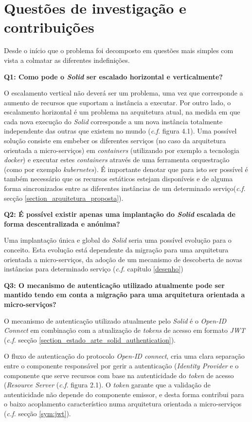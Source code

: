 \section{Questões de investigação e contribuições}
Desde o início que o problema foi decomposto em questões mais simples com vista a colmatar as diferentes indefinições.

\textbf{Q1: {Como pode o \emph{Solid} ser escalado horizontal e verticalmente?}}

O escalamento vertical não deverá ser um problema, uma vez que corresponde a aumento de recursos que suportam a instância a executar.
Por outro lado, o escalamento horizontal é um problema na arquitetura atual, na medida em que cada nova execução do \emph{Solid} corresponde a um nova instância totalmente independente das outras que existem no mundo (\emph{c.f.} figura 4.1).
Uma possível solução consiste em embeber os diferentes serviços (no caso da arquitetura orientada a micro-serviços) em \emph{containers} (utilizando por exemplo a tecnologia \emph{docker}) e executar estes \emph{containers} através de uma ferramenta orquestração (como por exemplo \emph{kubernetes}). É importante denotar que para isto ser possível é também necessário que os recursos estáticos estejam disponíveis e de alguma forma sincronizados entre as diferentes instâncias de um determinado serviço(\emph{c.f.} secção \ref{section_arquitetura_proposta}).

\textbf{Q2: É possível existir apenas uma implantação do \emph{Solid} escalada de forma descentralizada e anónima?}

Uma implantação única e global do \emph{Solid} seria uma possível evolução para o conceito. Esta evolução está dependente da migração para uma arquitetura orientada a micro-serviços, da adoção de um mecanismo de descoberta de novas instâncias para determinado serviço (\emph{c.f.} capítulo \ref{desenho})

\textbf{Q3: O mecanismo de autenticação utilizado atualmente pode ser mantido tendo em conta a migração para uma arquitetura orientada a micro-serviços?}

O mecanismo de autenticação utilizado atualmente pelo \emph{Solid} é o \emph{Open-ID Connect} em combinação com a atualização de \emph{tokens} de acesso em formato \emph{JWT} (\emph{c.f.} secção \ref{section_estado_arte_solid_authentication}).

O fluxo de autenticação do protocolo \emph{Open-ID connect}, cria uma clara separação entre o componente responsável por gerir a autenticação (\emph{Identity Provider} e o componente que serve recursos com base na autenticidade do \emph{token} de acesso (\emph{Resource Server} (\emph{c.f.} figura 2.1). O \emph{token} garante que a validação de autenticidade não depende do componente emissor, e desta forma contribui para o baixo acoplamento característico numa arquitetura orientada a micro-serviços (\emph{c.f.} secção \ref{sym:jwt}).


